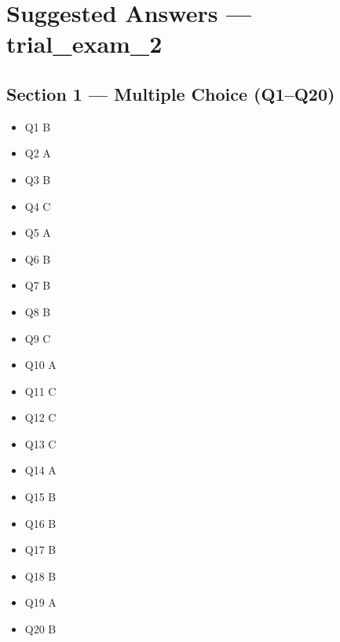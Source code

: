 \documentclass[11pt,a4paper]{article}
\begin{document}
\section*{Suggested Answers --- trial\_exam\_2}

\subsection*{Section 1 --- Multiple Choice (Q1--Q20)}
\begin{itemize}
    \item Q1 B
    \item Q2 A
    \item Q3 B
    \item Q4 C
    \item Q5 A
    \item Q6 B
    \item Q7 B
    \item Q8 B
    \item Q9 C
    \item Q10 A
    \item Q11 C
    \item Q12 C
    \item Q13 C
    \item Q14 A
    \item Q15 B
    \item Q16 B
    \item Q17 B
    \item Q18 B
    \item Q19 A
    \item Q20 B
\end{itemize}
\end{document}
